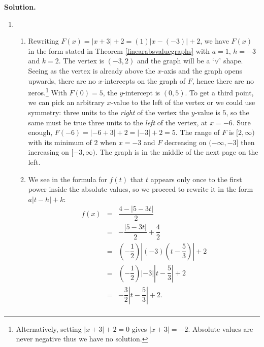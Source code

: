 \begin{ex}
\begin {enumerate}
\begin{center}
\end{center}

\end{enumerate}


{\bf Solution.}

\begin{enumerate}

\item \begin{enumerate}

\item Rewriting $F(x) = |x + 3| + 2 = (1)|x - (-3)| + 2$, we have $F(x)$ in the form stated in Theorem \ref{linearabsvaluegraphs} with $a = 1$, $h = -3$ and $k = 2$.  The vertex is $(-3, 2)$ and the graph will be a `$\vee$' shape.  Seeing as the vertex is already above the $x$-axis and the graph opens upwards, there are no $x$-intercepts on the graph of $F$, hence there are no zeros.\footnote{Alternatively, setting $|x + 3| + 2 = 0$ gives $|x + 3| = -2$. Absolute values are never negative thus we have no solution.}  With $F(0) = 5$, the $y$-intercept is $(0,5)$.  To get a third point, we can pick an arbitrary $x$-value to the left of the vertex or we could use symmetry: three units to the \textit{right} of the vertex the $y$-value is $5$, so the same must be true three units to the \textit{left} of the vertex, at $x = -6$.  Sure enough, $F(-6) = |-6 + 3| + 2 = |-3| + 2 = 5$.  The range of $F$ is $[2, \infty)$ with its minimum of $2$ when $x = -3$ and $F$ decreasing on $(-\infty, -3]$ then increasing on $[-3, \infty)$.  The graph is in the middle of the next page on the left.

\item We see in the formula for $f(t)$ that $t$ appears only once to the first power inside the absolute values, so we proceed to rewrite it in the form $a|t-h|+k$: \[ \begin{array}{rcl}

f(x) & =&  \dfrac{4 - |5-3t|}{2} \\ [10pt]
      & = & - \dfrac{|5-3t|}{2} + \dfrac{4}{2} \\ [12pt]
      & = & \left(-\dfrac{1}{2}\right) \left| (-3) \left( t - \dfrac{5}{3} \right) \right| + 2  \\  [12pt]
     & = &  \left(-\dfrac{1}{2}\right) |-3|  \left| t - \dfrac{5}{3}  \right|  + 2 \\ [12pt]
     & = & -\dfrac{3}{2}   \left| t - \dfrac{5}{3}  \right|  + 2.  \\ 
     

\end{array}\]
\end{enumerate}
\end{enumerate}
\end{ex}
